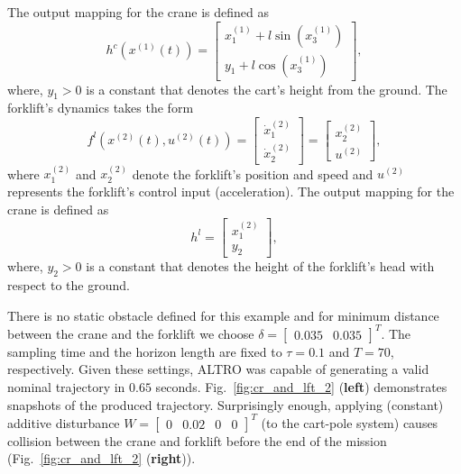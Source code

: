 The output mapping for the crane is defined as
\[
h^c(x^{(1)}(t))=\begin{bmatrix}
	x_1^{(1)}+l \sin(x_3^{(1)})\\
	y_1+l \cos(x_3^{(1)})
\end{bmatrix},
\]
where, $y_1>0$ is a constant that denotes the cart's height from the ground.
The forklift's dynamics takes the form
\[f^{l}(x^{(2)}(t),u^{(2)}(t))=\begin{bmatrix}
\dot{x}_1^{(2)}\\ \dot{x}^{(2)}_2 \end{bmatrix}=\begin{bmatrix} x^{(2)}_2\\ u^{(2)} \end{bmatrix},
\]
where $x_1^{(2)}$ and $x_2^{(2)}$ denote the forklift's position and speed and $u^{(2)}$ represents the forklift's control input (acceleration). The output mapping for the crane is defined as
\[
h^l=\begin{bmatrix}
	x_1^{(2)}\\
	y_2
\end{bmatrix},
\]
where, $y_2>0$ is a constant that denotes the height of the forklift's head with respect to the ground.

There is no static obstacle defined for this example and for minimum distance between the crane and the forklift we choose $\delta=\begin{bmatrix}0.035&0.035\end{bmatrix}^T$. The sampling time and the horizon length are fixed to $\tau=0.1$ and $T=70$, respectively. Given these settings, ALTRO was capable of generating a valid nominal trajectory in $0.65$ seconds. Fig.~\ref{fig:cr_and_lft_2} (\textbf{left}) demonstrates snapshots of the produced trajectory. Surprisingly enough, applying (constant) additive disturbance $W=\begin{bmatrix}0&0.02&0&0\end{bmatrix}^T$ (to the cart-pole system) causes collision between the crane and forklift before the end of the mission (Fig.~\ref{fig:cr_and_lft_2} (\textbf{right})).

